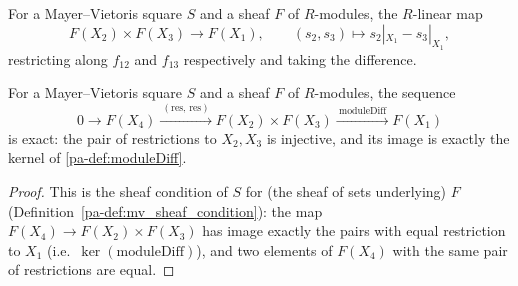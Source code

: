 \begin{definition}
  \label{pa-def:moduleDiff}
  \leanok

  For a Mayer--Vietoris square \(S\) and a sheaf \(F\) of \(R\)-modules, the \(R\)-linear map
  \[
    F(X_2) \times F(X_3) \longrightarrow F(X_1), \qquad
    (s_2, s_3) \longmapsto s_2|_{X_1} - s_3|_{X_1},
  \]
  restricting along \(f_{12}\) and \(f_{13}\) respectively and taking the difference.
\end{definition}

\begin{lemma}
  \label{pa-lem:mv_exact_degree0}
  \leanok

  For a Mayer--Vietoris square \(S\) and a sheaf \(F\) of \(R\)-modules, the sequence
  \[
    0 \to F(X_4) \xrightarrow{\ (\mathrm{res},\,\mathrm{res})\ } F(X_2) \times F(X_3)
      \xrightarrow{\ \mathrm{moduleDiff}\ } F(X_1)
  \]
  is exact: the pair of restrictions to \(X_2, X_3\) is injective, and its image is exactly
  the kernel of \ref{pa-def:moduleDiff}.
\end{lemma}
\begin{proof}
  \leanok
  This is the sheaf condition of \(S\) for (the sheaf of sets underlying) \(F\)
  (Definition~\ref{pa-def:mv_sheaf_condition}): the map \(F(X_4) \to F(X_2) \times F(X_3)\) has
  image exactly the pairs with equal restriction to \(X_1\) (i.e.\
  \(\ker(\mathrm{moduleDiff})\)), and two elements of \(F(X_4)\) with the same pair of
  restrictions are equal.
\end{proof}

